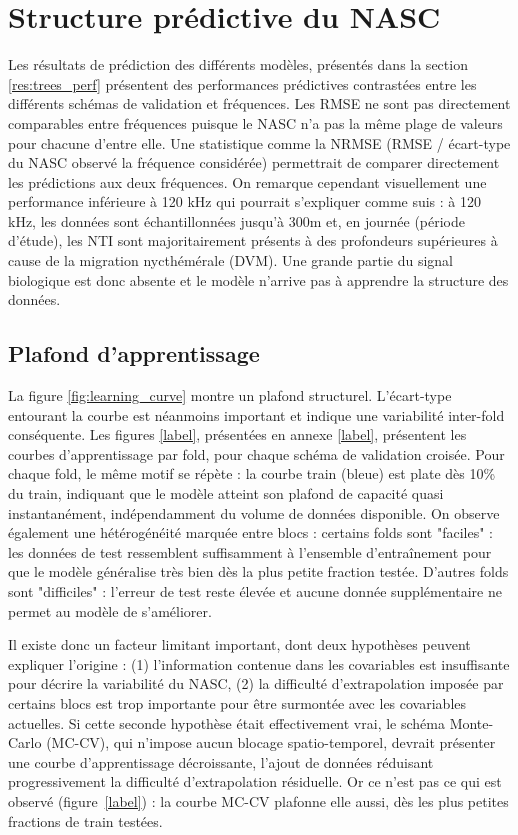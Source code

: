 \section{Structure prédictive du NASC}
Les résultats de prédiction des différents modèles, présentés dans la section \ref{res:trees_perf} présentent des performances prédictives contrastées entre les différents schémas de validation et fréquences. Les RMSE ne sont pas directement comparables entre fréquences puisque le NASC n'a pas la même plage de valeurs pour chacune d'entre elle. Une statistique comme la NRMSE (RMSE / écart-type du NASC observé la fréquence considérée) permettrait de comparer directement les prédictions aux deux fréquences. On remarque cependant visuellement une performance inférieure à 120 kHz qui pourrait s'expliquer comme suis : à 120 kHz, les données sont échantillonnées jusqu'à 300m et, en journée (période d'étude), les NTI sont majoritairement présents à des profondeurs supérieures à cause de la migration nycthémérale (DVM). Une grande partie du signal biologique est donc absente et le modèle n'arrive pas à apprendre la structure des données.

\subsection{Plafond d'apprentissage}
La figure \ref{fig:learning_curve} montre un plafond structurel. L'écart-type entourant la courbe est néanmoins important et indique une variabilité inter-fold conséquente. Les figures \ref{label}, présentées en annexe \ref{label}, présentent les courbes d'apprentissage par fold, pour chaque schéma de validation croisée. Pour chaque fold, le même motif se répète : la courbe train (bleue) est plate dès 10\% du train, indiquant que le modèle atteint son plafond de capacité quasi instantanément, indépendamment du volume de données disponible. On observe également une hétérogénéité marquée entre blocs : certains folds sont "faciles" : les données de test ressemblent suffisamment à l'ensemble d'entraînement pour que le modèle généralise très bien dès la plus petite fraction testée. D'autres folds sont "difficiles" : l'erreur de test reste élevée et aucune donnée supplémentaire ne permet au modèle de s'améliorer.

Il existe donc un facteur limitant important, dont deux hypothèses peuvent expliquer l'origine : (1) l'information contenue dans les covariables est insuffisante pour décrire la variabilité du NASC, (2) la difficulté d'extrapolation imposée par certains blocs est trop importante pour être surmontée avec les covariables actuelles. Si cette seconde hypothèse était effectivement vrai, le schéma Monte-Carlo (MC-CV), qui n'impose aucun blocage spatio-temporel, devrait présenter une courbe d'apprentissage décroissante, l'ajout de données réduisant progressivement la difficulté d'extrapolation résiduelle. Or ce n'est pas ce qui est observé (figure~\ref{label}) : la courbe MC-CV plafonne elle aussi, dès les plus petites fractions de train testées.

